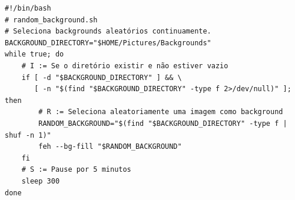 \documentclass[12pt,a4paper]{article}
\begin{document}
\begin{lstlisting}
#!/bin/bash
# random_background.sh
# Seleciona backgrounds aleatórios continuamente.
BACKGROUND_DIRECTORY="$HOME/Pictures/Backgrounds"
while true; do
    # I := Se o diretório existir e não estiver vazio
    if [ -d "$BACKGROUND_DIRECTORY" ] && \
       [ -n "$(find "$BACKGROUND_DIRECTORY" -type f 2>/dev/null)" ]; then
        # R := Seleciona aleatoriamente uma imagem como background
        RANDOM_BACKGROUND="$(find "$BACKGROUND_DIRECTORY" -type f | shuf -n 1)"
        feh --bg-fill "$RANDOM_BACKGROUND"
    fi
    # S := Pause por 5 minutos
    sleep 300
done
\end{lstlisting}


\end{document}
